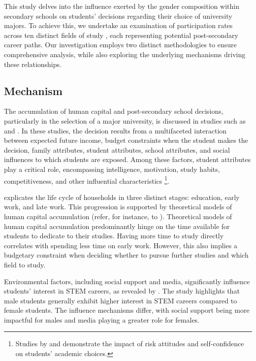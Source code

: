 

This study delves into the influence exerted by the gender composition within secondary schools on students' decisions regarding their choice of university majors. To achieve this, we undertake an examination of participation rates across ten distinct fields of study , each representing potential post-secondary career paths. Our investigation employs two distinct methodologies to ensure comprehensive analysis, while also exploring the underlying mechanisms driving these relationships.


\subsection{Mechanism}
The accumulation of human capital and post-secondary school decisions, particularly in the selection of a major university, is discussed in studies such as \citet{Hanushek1979} and \citet{Petra2003}. In these studies, the decision results from a multifaceted interaction between expected future income, budget constraints when the student makes the decision, family attributes, student attributes, school attributes, and social influences to which students are exposed. Among these factors, student attributes play a critical role, encompassing intelligence, motivation, study habits, competitiveness, and other influential characteristics \footnote{Studies by \citet{LONNQVIST2015254} and \citet{Thomas2014} demonstrate the impact of risk attitudes and self-confidence on students' academic choices.}.

\citet{NBERw22010} explicates the life cycle of households in three distinct stages: education, early work, and late work. This progression is supported by theoretical models of human capital accumulation (refer, for instance, to \citet{BenPorath}). Theoretical models of human capital accumulation predominantly hinge on the time available for students to dedicate to their studies. Having more time to study directly correlates with spending less time on early work. However, this also implies a budgetary constraint when deciding whether to pursue further studies and which field to study.  

Environmental factors, including social support and media, significantly influence students' interest in STEM careers, as revealed by \citet{Wang2023Gender}. The study highlights that male students generally exhibit higher interest in STEM careers compared to female students. The influence mechanisms differ, with social support being more impactful for males and media playing a greater role for females. 
 
